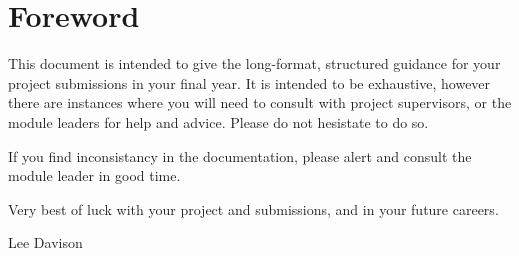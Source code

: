 \chapter{Foreword}

This document is intended to give the long-format, structured guidance for your project submissions in your final year. It is intended to be exhaustive, however there are instances where you will need to consult with project supervisors, or the module leaders for help and advice. Please do not hesistate to do so. 

If you find inconsistancy in the documentation, please alert and consult the module leader in good time. 

Very best of luck with your project and submissions, and in your future careers.

\medskip

Lee Davison

